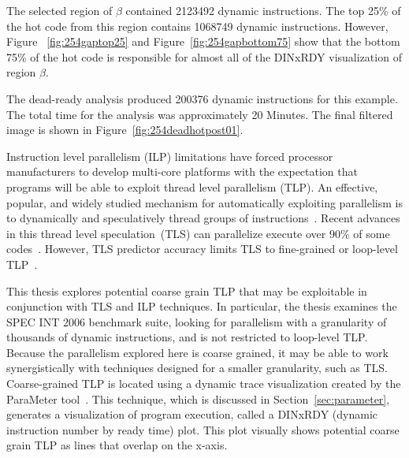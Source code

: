 {The selected region of $\beta$ contained 2123492 dynamic instructions. The top 25\% of the hot code from this region contains 1068749 dynamic instructions.  However, Figure ~\ref{fig:254gaptop25} and Figure~\ref{fig:254gapbottom75} show that the bottom 75\% of the hot code is responsible for almost all of the DINxRDY visualization of region $\beta$.

The dead-ready analysis produced 200376 dynamic instructions for this example.  The total time for the analysis was approximately 20 Minutes.  The final filtered image is shown in Figure~\ref{fig:254deadhotpost01}.


Instruction level parallelism (ILP) limitations have forced processor manufacturers to develop multi-core platforms with the expectation that programs will be able to exploit thread level parallelism (TLP). An effective, popular, and widely studied mechanism for automatically exploiting parallelism is to dynamically and speculatively thread groups of instructions~\cite{steffan:00:isca,prabhu:03:ppopp,wu:2008:cdp,chen:cc:2004,vachharajani:07:pact,dou:2007:trans,wang:2009:dps,marcuello:00:ipdps,bridges:2007:micro,thies:2007:micro,raman:2010:asplos}. Recent advances in this thread level speculation~(TLS) can parallelize execute over 90\% of some codes~\cite{marcuello:00:ipdps}.  However, TLS predictor accuracy limits TLS to fine-grained or loop-level TLP~\cite{marcuello:00:ipdps,warg:2001:pact,bridges:2007:micro,thies:2007:micro,raman:2010:asplos}.

This thesis explores potential coarse grain TLP that may be exploitable in conjunction with TLS and ILP techniques.  In particular, the thesis examines the SPEC INT 2006 benchmark suite, looking for parallelism with a granularity of thousands of dynamic instructions, and is not restricted to loop-level TLP.  Because the parallelism explored here is coarse grained, it may be able to work synergistically with techniques designed for a smaller granularity, such as TLS. Coarse-grained TLP is located using a dynamic trace visualization created by the ParaMeter tool~\cite{price:08:pact}. This technique, which is discussed in Section~\ref{sec:parameter}, generates a visualization of program execution, called a DINxRDY (dynamic instruction number by ready time) plot.  This plot visually shows potential coarse grain TLP as lines that overlap on the x-axis.

}
